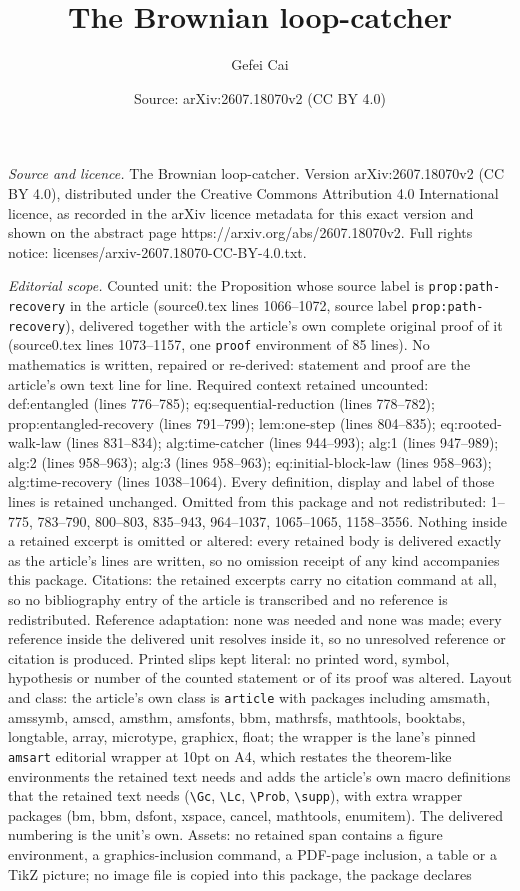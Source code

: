 \documentclass[10pt,a4paper]{amsart}
\title[The Brownian loop-catcher]{The Brownian loop-catcher}
\author{Gefei Cai}
\date{Source: arXiv:2607.18070v2 (CC BY 4.0)}
\begin{document}
\maketitle

\noindent\emph{Source and licence.} The Brownian loop-catcher. Version arXiv:2607.18070v2 (CC BY 4.0), distributed under the Creative Commons Attribution 4.0 International licence, as recorded in the arXiv licence metadata for this exact version and shown on the abstract page https://arxiv.org/abs/2607.18070v2. Full rights notice: licenses/arxiv-2607.18070-CC-BY-4.0.txt.\par\smallskip

\noindent\textit{Editorial scope.} Counted unit: the Proposition whose source label is \texttt{prop:path-recovery} in the article (source0.tex lines 1066--1072, source label \texttt{prop:path-recovery}), delivered together with the article's own complete original proof of it (source0.tex lines 1073--1157, one \texttt{proof} environment of 85 lines). No mathematics is written, repaired or re-derived: statement and proof are the article's own text line for line. Required context retained uncounted: def:entangled (lines 776--785); eq:sequential-reduction (lines 778--782); prop:entangled-recovery (lines 791--799); lem:one-step (lines 804--835); eq:rooted-walk-law (lines 831--834); alg:time-catcher (lines 944--993); alg:1 (lines 947--989); alg:2 (lines 958--963); alg:3 (lines 958--963); eq:initial-block-law (lines 958--963); alg:time-recovery (lines 1038--1064). Every definition, display and label of those lines is retained unchanged. Omitted from this package and not redistributed: 1--775, 783--790, 800--803, 835--943, 964--1037, 1065--1065, 1158--3556. Nothing inside a retained excerpt is omitted or altered: every retained body is delivered exactly as the article's lines are written, so no omission receipt of any kind accompanies this package. Citations: the retained excerpts carry no citation command at all, so no bibliography entry of the article is transcribed and no reference is redistributed. Reference adaptation: none was needed and none was made; every reference inside the delivered unit resolves inside it, so no unresolved reference or citation is produced. Printed slips kept literal: no printed word, symbol, hypothesis or number of the counted statement or of its proof was altered. Layout and class: the article's own class is \texttt{article} with packages including amsmath, amssymb, amscd, amsthm, amsfonts, bbm, mathrsfs, mathtools, booktabs, longtable, array, microtype, graphicx, float; the wrapper is the lane's pinned \texttt{amsart} editorial wrapper at 10pt on A4, which restates the theorem-like environments the retained text needs and adds the article's own macro definitions that the retained text needs (\texttt{\textbackslash Gc}, \texttt{\textbackslash Lc}, \texttt{\textbackslash Prob}, \texttt{\textbackslash supp}), with extra wrapper packages (bm, bbm, dsfont, xspace, cancel, mathtools, enumitem). The delivered numbering is the unit's own. Assets: no retained span contains a figure environment, a graphics-inclusion command, a PDF-page inclusion, a table or a TikZ picture; no image file is copied into this package, the package declares 
\end{document}
